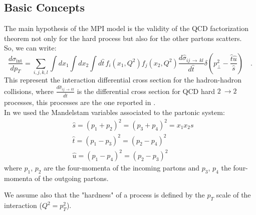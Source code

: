 \subsection{Basic Concepts}
\label{sec:BasicConcepts}

The main hypothesis of the MPI model is the validity of the QCD factorization theorem not only for the hard process but also for the other partons scatters.
\\
So, we can write:
\begin{equation}
	\frac{d\sigma_{\text{int}}}{dp_T}=\displaystyle\sum_{i,j,k,l}\displaystyle\int dx_1 \displaystyle\int dx_2 \displaystyle\int d\hat{t}\, f_i(x_1,Q^2)f_j(x_2,Q^2)\frac{d\hat{\sigma}_{ij\,\rightarrow\,kl}}{d\hat{t}}\delta\left( p_\perp^2-\frac{\hat{t}\hat{u}}{\hat{s}} \right) \quad .
	\label{eq:sigma_int1}
\end{equation}
This represent the interaction differential cross section for the hadron-hadron collisions, where $\frac{d\hat{\sigma}_{ij\,\rightarrow\,kl}}{d\hat{t}}$ is the differential cross section for QCD hard $2\ \rightarrow 2$ processes, this processes are the one reported in . 
\\
In  we used the Mandelstam variables associated to the partonic system:
\begin{align}
	&\hat{s}=(p_1+p_2)^2=(p_3+p_4)^2=x_1x_2s\\
	&\hat{t}=(p_1-p_3)^2=(p_2-p_4)^2\\
	&\hat{u}=(p_1-p_4)^2=(p_2-p_3)^2
\end{align} 
where $p_1$, $p_2$ are the four-momenta of the incoming partons and $p_3$, $p_4$ the four-momenta of the outgoing partons. 


\noindent We assume also that the "hardness" of a  process is defined by the $p_T$ scale of the interaction ($Q^2=p_T^2$).

